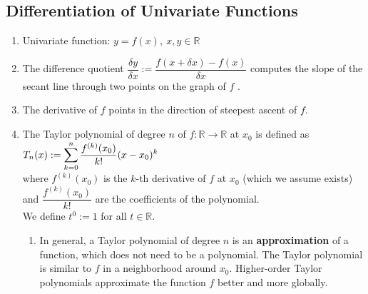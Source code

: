 \subsection{Differentiation of Univariate Functions}

\begin{enumerate}
    \item Univariate function: $y = f(x),\ x, y \in \mathbb{R}$
    \hfill \cite{mfml/book/mml/Deisenroth-Faisal-Ong}

    \item 
    \begin{definition}
        The difference quotient
        $
            \dfrac{\delta y}{\delta x} 
            := \dfrac{f(x + \delta x) - f(x)}{\delta x}
        $
        computes the slope of the secant line through two points on the graph of $f$ .
        \hfill \cite{mfml/book/mml/Deisenroth-Faisal-Ong}
    \end{definition}

    \item The derivative of $f$ points in the direction of steepest ascent of $f$. 
    \hfill \cite{mfml/book/mml/Deisenroth-Faisal-Ong}

    \item 
    \begin{definition}
        The Taylor polynomial of degree $n$ of $f : \mathbb{R} \to \mathbb{R}$ at $x_0$ is defined as
        $
            T_n(x)
            := \displaystyle\sum_{k=0}^n \dfrac{f^{(k)}(x_0)}{k!} (x - x_0)^k
        $
        \hfill \cite{mfml/book/mml/Deisenroth-Faisal-Ong}
        \\
        where $f ^{(k)}(x_0)$ is the $k$-th derivative of $f$ at $x_0$ (which we assume exists) and $\dfrac{f ^{(k)}(x_0)}{ k!}$ are the coefficients of the polynomial.
        \hfill \cite{mfml/book/mml/Deisenroth-Faisal-Ong}
        \\
        We define $t^0 := 1$ for all $t \in \mathbb{R}$.
        \hfill \cite{mfml/book/mml/Deisenroth-Faisal-Ong}
    \end{definition}
    \begin{enumerate}
        \item In general, a Taylor polynomial of degree $n$ is an \textbf{approximation} of a function, which does not need to be a polynomial. 
        The Taylor polynomial is similar to $f$ in a neighborhood around $x_0$. 
        Higher-order Taylor polynomials approximate the function $f$ better and more globally.
        \hfill \cite{mfml/book/mml/Deisenroth-Faisal-Ong}
        

\end{enumerate}
\end{enumerate}
